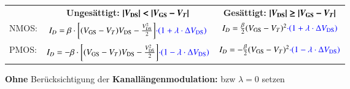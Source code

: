 \resizebox{\columnwidth}{!}
{
    \renewcommand{\arraystretch}{1.5}
    \begin{tabular}{@{}l c | c@{}}
                & \textbf{Ungesättigt:} \quad $\bm{| V_{\rm DS} | < | V_{\rm GS} - V_T |}$                                                              & \textbf{Gesättigt:} \quad $\bm{| V_{\rm DS} | \geq | V_{\rm GS} - V_T |}$                         \\
        NMOS:   & $I_D = \beta \cdot \bigg[ (V_{\rm GS} - V_T) V_{\rm DS} - \frac{V_{\rm DS}^2}{2} \bigg] {\color{blue}\cdot (1 + \lambda \cdot \Delta V_{\rm DS})}$    & $I_D = \frac{\beta}{2} (V_{\rm GS} - V_T)^2 {\color{blue}\cdot (1 + \lambda \cdot \Delta V_{\rm DS})}$    \\
        \midrule
        PMOS:   & $I_D = - \beta \cdot \bigg[ (V_{\rm GS} - V_T) V_{\rm DS} - \frac{V_{\rm DS}^2}{2} \bigg] {\color{blue}\cdot (1 - \lambda \cdot \Delta V_{\rm DS})}$  & $I_{D} = - \frac{\beta}{2} (V_{\rm GS} - V_T)^2 {\color{blue}\cdot (1 - \lambda \cdot \Delta V_{\rm DS})}$
    \end{tabular}
    \renewcommand{\arraystretch}{1}
}

\medskip

\textbf{Ohne} Berücksichtigung der \textbf{Kanallängenmodulation:}  bzw $\lambda = 0$ setzen







